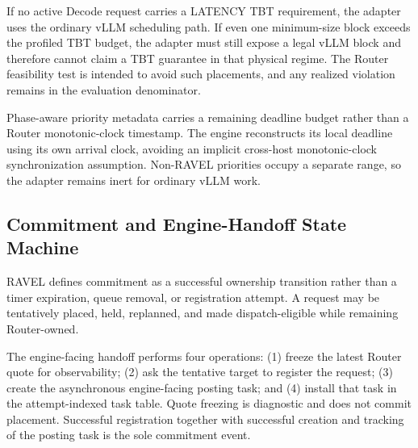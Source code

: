 \documentclass[letterpaper,twocolumn,10pt]{article}
\begin{document}
If no active Decode request carries a LATENCY TBT requirement, the adapter
uses the ordinary vLLM scheduling path.
If even one minimum-size block exceeds the profiled TBT budget, the adapter
must still expose a legal vLLM block and therefore cannot claim a TBT
guarantee in that physical regime.
The Router feasibility test is intended to avoid such placements, and any
realized violation remains in the evaluation denominator.

Phase-aware priority metadata carries a remaining deadline budget rather than
a Router monotonic-clock timestamp.
The engine reconstructs its local deadline using its own arrival clock,
avoiding an implicit cross-host monotonic-clock synchronization assumption.
Non-RAVEL priorities occupy a separate range, so the adapter remains inert for
ordinary vLLM work.


\subsection{Commitment and Engine-Handoff State Machine}
\label{sec:appendix:handoff}

RAVEL defines commitment as a successful ownership transition rather than a
timer expiration, queue removal, or registration attempt.
A request may be tentatively placed, held, replanned, and made
dispatch-eligible while remaining Router-owned.

The engine-facing handoff performs four operations:
(1) freeze the latest Router quote for observability;
(2) ask the tentative target to register the request;
(3) create the asynchronous engine-facing posting task; and
(4) install that task in the attempt-indexed task table.
Quote freezing is diagnostic and does not commit placement.
Successful registration together with successful creation and tracking of the
posting task is the sole commitment event.
\end{document}
